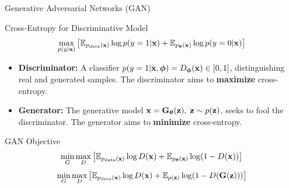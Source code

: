 \documentclass{beamer}
\begin{document}
\begin{frame}{Generative Adversarial Networks (GAN)}
	\begin{block}{Cross-Entropy for Discriminative Model}
		\vspace{-0.3cm}
		\[
			\max_{p(y | \mathbf{x})} \left[\mathbb{E}_{p_{\text{data}}(\mathbf{x})} \log p(y = 1 | \mathbf{x}) + \mathbb{E}_{p_{\boldsymbol{\theta}}(\mathbf{x})} \log p(y = 0 | \mathbf{x}) \right] 
		\]
	\end{block}
	\eqpause
	\begin{itemize}
		\item \textbf{Discriminator:} A classifier $p(y = 1 | \mathbf{x}, \boldsymbol{\phi}) = D_{\boldsymbol{\phi}}(\mathbf{x}) \in [0, 1]$, distinguishing real and generated samples. The discriminator aims to \textbf{maximize} cross-entropy.
		\item \textbf{Generator:} The generative model $\mathbf{x} = \mathbf{G}_{\boldsymbol{\theta}}(\mathbf{z}),\; \mathbf{z} \sim p(\mathbf{z})$, seeks to fool the discriminator. The generator aims to \textbf{minimize} cross-entropy.
	\end{itemize}
	\eqpause
	\begin{block}{GAN Objective}
		\vspace{-0.5cm}
		\[
			\min_{G} \max_D \left[ \mathbb{E}_{p_{\text{data}}(\mathbf{x})} \log D(\mathbf{x}) + \mathbb{E}_{p_{\boldsymbol{\theta}}(\mathbf{x})} \log (1 - D(\mathbf{x})) \right] 
		\]
		\eqpause
		\[
			\min_{G} \max_D \left[ \mathbb{E}_{p_{\text{data}}(\mathbf{x})} \log D(\mathbf{x}) + \mathbb{E}_{p(\mathbf{z})} \log (1 - D(\mathbf{G}(\mathbf{z}))) \right]
		\]
	\end{block}
\end{frame}
\end{document}
